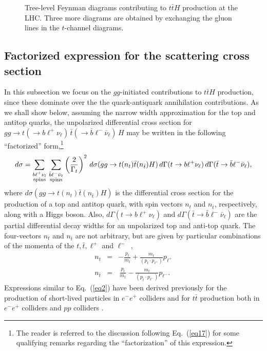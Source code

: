 \documentclass[aps,preprint,tightenlines,floatfix,superscriptaddress,nofootinbib,showpacs]{revtex4-1}
\def\beq{\begin{equation}}
\def\eeq{\end{equation}}
\def\bea{\begin{eqnarray}}
\def\eea{\end{eqnarray}}
\def\tbar{\bar{t}}
\def\bbar{\bar{b}}
\def\nubar{{\bar{\nu}}_{\ell}}
\begin{document}
\begin{center}
\begin{figure}[H]
\vspace*{0.02\textwidth}
\caption{Tree-level Feynman diagrams contributing to $t\tbar H$ production
  at the LHC. Three more diagrams are obtained by exchanging the gluon
  lines in the $t$-channel diagrams.}
\label{fig1}
\end{figure}
\end{center}
\subsection{Factorized expression for the scattering cross section}
\label{subsec:factorize}

In this subsection we focus on the $gg$-initiated
contributions
to $t\tbar H$ production, since these dominate over the
the quark-antiquark annihilation contributions. As we shall show below, assuming the
narrow width approximation for the top and antitop quarks, the unpolarized
differential cross section for $gg\to t(\to
b{\ell}^+\nu_{\ell})\,\tbar(\to \bbar {\ell}^- \nubar)\,H$ may be
written in the following ``factorized'' form,\footnote{The reader
  is referred to the discussion following Eq.~(\ref{eq17}) for some qualifying
  remarks regarding the ``factorization'' of this expression.}
%
\beq
\label{eq2}
d\sigma =\sum_{\substack{b{\ell}^+\nu_l \\ \tiny{\mathrm{spins}}}}\,
   \sum_{\substack{\bbar {\ell}^-\nubar \\ \mathrm{\tiny{spins}}}}\left(\frac{2}{\Gamma_t}\right)^2\,
   d\sigma(gg\to t(n_t)\tbar (n_{\tbar})H)\,
   d\Gamma(t\to b{\ell}^+\nu_{\ell})\,
   d\Gamma(\tbar \to \bbar {\ell}^-\nubar),
\eeq  
%
where $d\sigma(gg\to t(n_t)\tbar (n_{\tbar})H)$ is the differential
cross section for the production of a top and antitop quark,
with spin vectors $n_t$ and $n_{\bar{t}}$, respectively, along with a Higgs
boson.  Also, $d\Gamma(t\to b{\ell}^+\nu_{\ell})$ and
$d\Gamma(\tbar \to \bbar {\ell}^-\nubar)$ are the
partial differential decay widths for an unpolarized top and
anti-top quark.  The four-vectors
$n_t$ and $n_{\tbar}$ are not arbitrary, but are
given by particular combinations of the
momenta of the $t,\tbar, \ell^+$ and $\ell^-$~\cite{Arens},
%
\bea
\label{eq3}
n_t&=&-\frac{p_t}{m_t}+\frac{m_t}{(p_t\cdot p_{{\ell}^+})}p_{{\ell}^+}\\
\label{eq4}
n_{\tbar}&=&\,\frac{p_{\tbar}}{m_t}-\frac{m_t}{(p_{\tbar}\cdot p_{{\ell}^-})}p_{{\ell}^-}.
\eea
%
Expressions similar to Eq.~(\ref{eq2}) have been derived previously for the
production of short-lived particles in $e^-e^+$ colliders
\cite{kawasaki} and for $t\tbar$ production both in
$e^-e^+$ colliders \cite{Arens} and $pp$ colliders
\cite{ale1,*ale2,*ale3,*ale4}. \par
\end{document}
